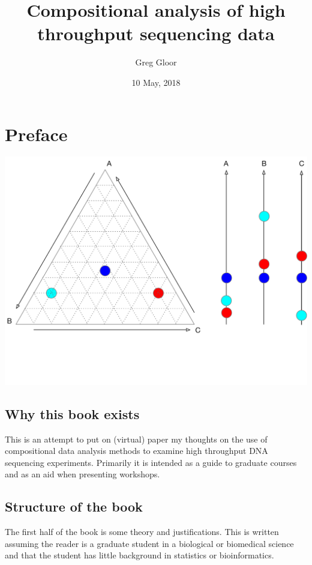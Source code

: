 \documentclass[onecolumn]{book}
\title{Compositional analysis of high throughput sequencing data}
\author{Greg Gloor}
\date{10 May, 2018}
\theoremstyle{definition}
\theoremstyle{definition}
\theoremstyle{definition}
\theoremstyle{remark}
\begin{document}
\maketitle

{
\setcounter{tocdepth}{2}
\tableofcontents
}
\hypertarget{preface}{%
\chapter*{Preface}\label{preface}}

\includegraphics{figs/simplex.pdf}

\hypertarget{why-this-book-exists}{%
\section*{Why this book exists}\label{why-this-book-exists}}

This is an attempt to put on (virtual) paper my thoughts on the use of
compositional data analysis methods to examine high throughput DNA
sequencing experiments. Primarily it is intended as a guide to graduate
courses and as an aid when presenting workshops.

\hypertarget{structure-of-the-book}{%
\section*{Structure of the book}\label{structure-of-the-book}}

The first half of the book is some theory and justifications. This is
written assuming the reader is a graduate student in a biological or
biomedical science and that the student has little background in
statistics or bioinformatics.
\end{document}
